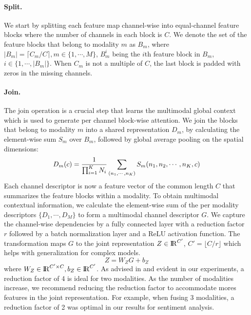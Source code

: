 \documentclass[10pt,twocolumn,letterpaper]{article}
\begin{document}
\paragraph{Split.}
We start by splitting each feature map channel-wise into equal-channel feature blocks where the number of channels in each block is $C$. We denote the set of the feature blocks that belong to modality $m$ as $B_m$, where $|B_m| = \lceil {C_m / C }\rceil , m \in \{1, \cdots, M\}$, $ B_m^i $ being the $i$th feature block in $B_m$, $i \in \{1, \cdots, |B_m|\}$. When $C_m$ is not a multiple of $C$, the last block is padded with zeros in the missing channels. 

\paragraph{Join.}
The join operation is a crucial step that learns the multimodal global context which is used to generate per channel block-wise attention. We join the blocks that belong to modality $m$ into a shared representation $D_m$, by calculating the element-wise sum $S_m$ over $B_m$, followed by global average pooling on the spatial dimensions: 
\begin{equation}
    D_m (c) = {1 \over \prod_{i=1}^{K} N_i} \sum_{(n_1, \cdots, n_K)} S_m(n_1, n_2, \cdots, n_K, c)
\end{equation}
Each channel descriptor is now a feature vector of the common length $C$ that summarizes the feature blocks within a modality. To obtain multimodal contextual information, we calculate the element-wise sum of the per modality descriptors $\{D_1, \cdots, D_M\}$ to form a multimodal channel descriptor $G$.
We capture the channel-wise dependencies by a fully connected layer with a reduction factor $r$ followed by a batch normalization layer and a ReLU activation function. The transformation maps $G$ to the joint representation $Z \in {\rm I\!R}^{C^{\prime}}$, $C'=\lfloor C/r \rfloor$ which helps with generalization for complex models. 
\begin{equation}
    Z = W_Z G + b_Z
\end{equation}
where $W_Z \in {\rm I\!R}^{C^{\prime}\times C}, b_Z \in {\rm I\!R}^{C^{\prime}}$. As advised in \cite{joze2020mmtm} and evident in our experiments, a reduction factor of 4 is ideal for two modalities. As the number of modalities increase, we recommend reducing the reduction factor to accommodate mores features in the joint representation. For example, when fusing 3 modalities, a reduction factor of 2 was optimal in our results for sentiment analysis.
\end{document}

